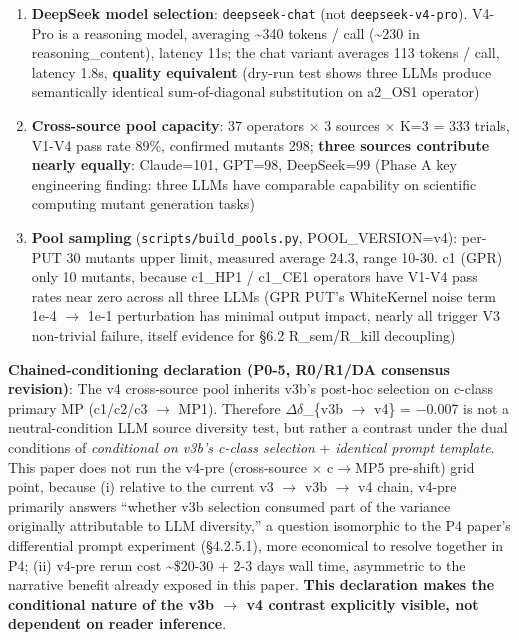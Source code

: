 \documentclass[review,12pt,authoryear]{elsarticle}
\begin{document}
\begin{enumerate}
\def\labelenumi{(\alph{enumi})}
\setcounter{enumi}{2}
\item
  \textbf{DeepSeek model selection}: \texttt{deepseek-chat} (not
  \texttt{deepseek-v4-pro}). V4-Pro is a reasoning model, averaging
  \textasciitilde340 tokens / call (\textasciitilde230 in
  reasoning\_content), latency 11s; the chat variant averages 113 tokens
  / call, latency 1.8s, \textbf{quality equivalent} (dry-run test shows
  three LLMs produce semantically identical sum-of-diagonal substitution
  on a2\_OS1 operator)
\item
  \textbf{Cross-source pool capacity}: 37 operators $\times$ 3 sources $\times$ K=3 =
  333 trials, V1-V4 pass rate 89\%, confirmed mutants 298; \textbf{three
  sources contribute nearly equally}: Claude=101, GPT=98, DeepSeek=99
  (Phase A key engineering finding: three LLMs have comparable
  capability on scientific computing mutant generation tasks)
\item
  \textbf{Pool sampling} (\texttt{scripts/build\_pools.py},
  POOL\_VERSION=v4): per-PUT 30 mutants upper limit, measured average
  24.3, range 10-30. c1 (GPR) only 10 mutants, because c1\_HP1 / c1\_CE1
  operators have V1-V4 pass rates near zero across all three LLMs (GPR
  PUT's WhiteKernel noise term 1e-4 $\to$ 1e-1 perturbation has minimal
  output impact, nearly all trigger V3 non-trivial failure, itself
  evidence for §6.2 R\_sem/R\_kill decoupling)
\end{enumerate}

\textbf{Chained-conditioning declaration (P0-5, R0/R1/DA consensus
revision)}: The v4 cross-source pool inherits v3b's post-hoc selection
on c-class primary MP (c1/c2/c3 $\to$ MP1). Therefore $\Delta$$\delta$\_\{v3b $\to$ v4\} =
−0.007 is not a neutral-condition LLM source diversity test, but rather
a contrast under the dual conditions of \emph{conditional on v3b's
c-class selection} + \emph{identical prompt template}. This paper does
not run the v4-pre (cross-source $\times$ c$\to$MP5 pre-shift) grid point, because
(i) relative to the current v3 $\to$ v3b $\to$ v4 chain, v4-pre primarily
answers ``whether v3b selection consumed part of the variance originally
attributable to LLM diversity,'' a question isomorphic to the P4 paper's
differential prompt experiment (§4.2.5.1), more economical to resolve
together in P4; (ii) v4-pre rerun cost \textasciitilde\$20-30 + 2-3 days
wall time, asymmetric to the narrative benefit already exposed in this
paper. \textbf{This declaration makes the conditional nature of the v3b
$\to$ v4 contrast explicitly visible, not dependent on reader inference}.
\end{document}

